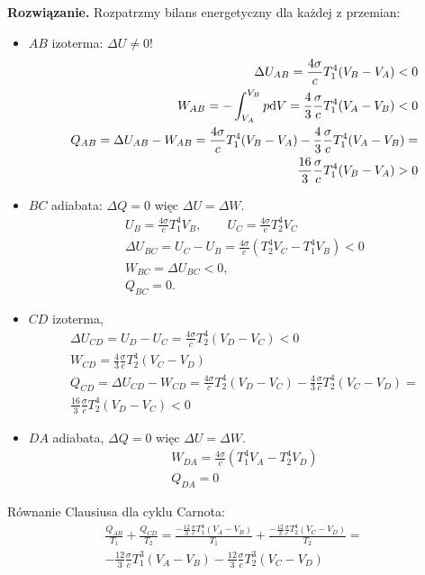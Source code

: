 \documentclass[11pt,a4paper]{article}
\newenvironment{solution}{\vspace{1cm} \par\textbf{Rozwiązanie.} \vspace{1cm}}{}
\begin{document}
\begin{solution}
Rozpatrzmy bilans energetyczny dla każdej z przemian:\\
\begin{itemize}
	\item $AB$ izoterma: $\Delta U \ne 0$!  
	\begin{align*}
    \Delta U_{AB} = \frac{4\sigma}{c} T_1^4 (V_B - V_A) < 0 \\
		W_{AB} = - \int_{V_A}^{V_B} p {\rm d}V = \frac{4}{3} \frac{\sigma}{c} T_1^4 (V_A - V_B) < 0 \\
		Q_{AB} = \Delta U_{AB} - W_{AB} =
     \frac{4\sigma}{c} T_1^4 (V_B - V_A)
    - \frac{4}{3} \frac{\sigma}{c} T_1^4 (V_A - V_B) = \\
    \frac{16}{3} \frac{\sigma}{c} T_1^4 (V_B - V_A) > 0
	\end{align*}
	\item $BC$ adiabata: $\Delta Q = 0$ więc $\Delta U = \Delta W$. 
	\begin{align*}
		U_{B} = \frac{4\sigma}{c} T_1^4 V_B, \qquad U_{C} = \frac{4\sigma}{c} T_2^4 V_C \\
    \Delta U_{BC} = U_C - U_B = \frac{4\sigma}{c} (T_2^4 V_C - T_1^4 V_B) < 0 \\
		W_{BC} = \Delta U_{BC} < 0, \\
    Q_{BC} = 0.
	\end{align*}
	\item $CD$ izoterma, 
	\begin{align*}
    \Delta U_{CD} = U_D - U_C = \frac{4\sigma}{c} T_2^4 (V_D - V_C) < 0 \\
		W_{CD} =  \frac{4}{3} \frac{\sigma}{c} T_2^4 (V_C - V_D) \\
    Q_{CD} = \Delta U_{CD} - W_{CD} =  
    \frac{4\sigma}{c} T_2^4 (V_D - V_C) - \frac{4}{3} \frac{\sigma}{c} T_2^4 (V_C - V_D) = \\
    \frac{16}{3} \frac{\sigma}{c} T_2^4 (V_D - V_C) < 0
	\end{align*}
	\item $DA$ adiabata, $\Delta Q = 0$ więc $\Delta U = \Delta W$.
	\begin{align*}
		W_{DA} = \frac{4\sigma}{c} (T_1^4 V_A - T_2^4 V_D) \\
    Q_{DA} = 0
	\end{align*}
\end{itemize}

Równanie Clausiusa dla cyklu Carnota:
\begin{align*}
  \frac{Q_{AB}}{T_1} + \frac{Q_{CD}}{T_2} = 
  \frac{-\frac{12}{3} \frac{\sigma}{c} T_1^4 (V_A - V_B)}{T_1} + \frac{-\frac{12}{3} \frac{\sigma}{c} T_2^4 (V_C - V_D)}{T_2} = \\
  -\frac{12}{3} \frac{\sigma}{c} T_1^3 (V_A - V_B) - \frac{12}{3} \frac{\sigma}{c} T_2^3 (V_C - V_D)
\end{align*}


\end{solution}
\end{document}
